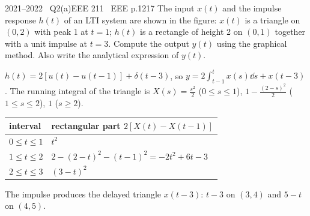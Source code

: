 \begin{qcard}{2021--2022 \textbullet\ Q2(a)}{EEE 211 \textbullet\ EEE p.12}{17}
The input $x(t)$ and the impulse response $h(t)$ of an LTI system are shown in the figure: $x(t)$ is a triangle on $(0,2)$ with peak 1 at $t=1$; $h(t)$ is a rectangle of height 2 on $(0,1)$ together with a unit impulse at $t=3$. Compute the output $y(t)$ using the graphical method. Also write the analytical expression of $y(t)$.
\end{qcard}
\begin{solution}
$h(t)=2[u(t)-u(t-1)]+\delta(t-3)$, so $y=2\int_{t-1}^{t}x(s)\dd s+x(t-3)$. The running integral of the triangle is $X(s)=\frac{s^2}{2}$ ($0\le s\le1$), $1-\frac{(2-s)^2}{2}$ ($1\le s\le2$), $1$ ($s\ge2$).
\begin{center}\small\begin{tabular}{@{}ll@{}}\toprule interval & rectangular part $2[X(t)-X(t-1)]$\\\midrule
$0\le t\le1$ & $t^2$\\
$1\le t\le2$ & $2-(2-t)^2-(t-1)^2=-2t^2+6t-3$\\
$2\le t\le3$ & $(3-t)^2$\\\bottomrule\end{tabular}\end{center}
The impulse produces the delayed triangle $x(t-3)$: $t-3$ on $(3,4)$ and $5-t$ on $(4,5)$.
\begin{center}\end{center}
\end{solution}


